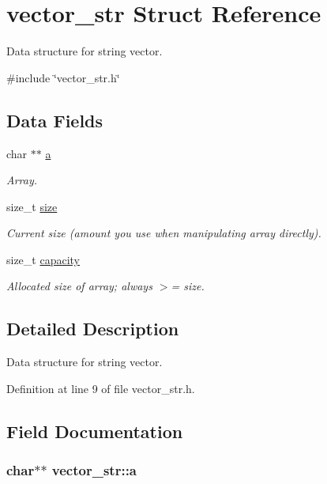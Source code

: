 \hypertarget{structvector__str}{\section{vector\-\_\-str Struct Reference}
\label{structvector__str}
}


Data structure for string vector.  




{\ttfamily \#include \char`\"{}vector\-\_\-str.\-h\char`\"{}}

\subsection*{Data Fields}
\begin{DoxyCompactItemize}
\item 
char $\ast$$\ast$ \hyperlink{structvector__str_a91f064ecae5d4f739f8aabd97fe6ddc2}{a}
\begin{DoxyCompactList}\small\item\em Array. \end{DoxyCompactList}\item 
size\-\_\-t \hyperlink{structvector__str_a63d4c1a5373481aa4ba9d4ee8252c748}{size}
\begin{DoxyCompactList}\small\item\em Current size (amount you use when manipulating array directly). \end{DoxyCompactList}\item 
size\-\_\-t \hyperlink{structvector__str_a8a52905a505acbcb9176be3eb6cf37f8}{capacity}
\begin{DoxyCompactList}\small\item\em Allocated size of array; always $>$= size. \end{DoxyCompactList}\end{DoxyCompactItemize}


\subsection{Detailed Description}
Data structure for string vector. 



Definition at line 9 of file vector\-\_\-str.\-h.



\subsection{Field Documentation}
\hypertarget{structvector__str_a91f064ecae5d4f739f8aabd97fe6ddc2}{
\subsubsection[{a}]{\setlength{\rightskip}{0pt plus 5cm}char$\ast$$\ast$ vector\-\_\-str\-::a}}\label{structvector__str_a91f064ecae5d4f739f8aabd97fe6ddc2}


